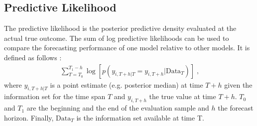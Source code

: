 \subsection{Predictive Likelihood}
\label{app:lpl}
The predictive likelihood is the posterior predictive density evaluated at the actual true outcome. The sum of log predictive likelihoods can be used to compare the forecasting performance of one model relative to other models. It is defined as follows \parencite{koop_forecasting_2013}:
\begin{align*}
    \sum_{T = T_0}^{T_1 - h} \log [ p(y_{i , T + h | T} = y_{i , T + h} | \text{Data}_T) ] \; \text{,}
\end{align*}
where $y_{i , T + h | T}$ is a point estimate (e.g. posterior median) at time $T + h$ given the information set for the time span $T$ and $y_{i , T + h}$ the true value at time $T + h$. $T_0$ and $T_1$ are the beginning and the end of the evaluation sample and $h$ the forecast horizon. Finally, $\text{Data}_T$ is the information set available at time T. 
